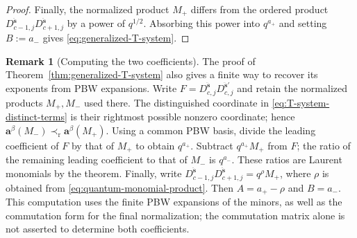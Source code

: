 \documentclass[12pt, reqno]{amsart}
\theoremstyle{plain}
\theoremstyle{definition}
\newtheorem{remark}[theorem]{Remark}
\numberwithin{equation}{section}
\begin{document}
\begin{proof}
Finally, the normalized product \(M_+\) differs from the ordered
product
\(
    D_{c-1,j}^{\ddot{\mathbf s}}
    D_{c+1,j}^{\ddot{\mathbf s}}
\)
by a power of \(q^{1/2}\). Absorbing this power into \(q^{a_+}\) and
setting \(B:=a_-\) gives
\eqref{eq:generalized-T-system}.
\end{proof}

\begin{remark}[Computing the two coefficients]
\label{rem:T-system-coefficients-PBW}
The proof of Theorem~\ref{thm:generalized-T-system} also gives
a finite way to recover its exponents from PBW expansions. Write
\(F=D_{c,j}^{\ddot{\mathbf s}}D_{c,j}^{\ddot{\mathbf s}'}\)
and retain the normalized products \(M_+,M_-\) used there.
The distinguished coordinate in
\eqref{eq:T-system-distinct-terms} is their rightmost possible
nonzero coordinate; hence
\(\mathbf a^\beta(M_-)\prec_{\mathrm r}\mathbf a^\beta(M_+)\).
Using a common PBW basis, divide the leading coefficient of
\(F\) by that of \(M_+\) to obtain \(q^{a_+}\). Subtract
\(q^{a_+}M_+\) from \(F\); the ratio of the remaining leading
coefficient to that of \(M_-\) is \(q^{a_-}\).
These ratios are Laurent monomials by the theorem. Finally,
write
\(D_{c-1,j}^{\ddot{\mathbf s}}D_{c+1,j}^{\ddot{\mathbf s}}
=q^\rho M_+\), where \(\rho\) is obtained from
\eqref{eq:quantum-monomial-product}. Then
\(A=a_+-\rho\) and \(B=a_-\).
This computation uses the finite PBW expansions
of the minors, as well as the commutation form for the final
normalization; the commutation matrix alone is not asserted to
determine both coefficients.
\end{remark}
\end{document}
